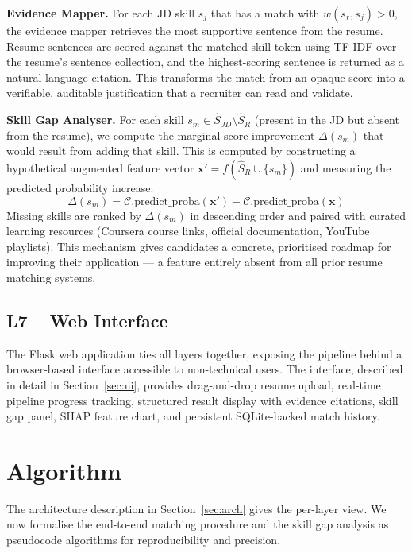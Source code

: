 \documentclass[conference]{IEEEtran}
\begin{document}
\textbf{Evidence Mapper.} For each JD skill $s_j$ that has a match with
$w(s_r, s_j) > 0$, the evidence mapper retrieves the most supportive
sentence from the resume. Resume sentences are scored against the matched
skill token using TF-IDF over the resume's sentence collection, and the
highest-scoring sentence is returned as a natural-language citation.
This transforms the match from an opaque score into a verifiable,
auditable justification that a recruiter can read and validate.

\textbf{Skill Gap Analyser.} For each skill $s_m \in \hat{S}_{JD}
\setminus \hat{S}_R$ (present in the JD but absent from the resume),
we compute the marginal score improvement $\Delta(s_m)$ that would result
from adding that skill. This is computed by constructing a hypothetical
augmented feature vector $\mathbf{x}' = f(\hat{S}_R \cup \{s_m\})$
and measuring the predicted probability increase:
\begin{equation}
  \Delta(s_m) = \mathcal{C}.\text{predict\_proba}(\mathbf{x}') -
               \mathcal{C}.\text{predict\_proba}(\mathbf{x})
  \label{eq:gap}
\end{equation}
Missing skills are ranked by $\Delta(s_m)$ in descending order and paired
with curated learning resources (Coursera course links, official documentation,
YouTube playlists). This mechanism gives candidates a concrete, prioritised
roadmap for improving their application --- a feature entirely absent from
all prior resume matching systems.

\subsection{L7 -- Web Interface}
The Flask web application ties all layers together, exposing the pipeline
behind a browser-based interface accessible to non-technical users. The
interface, described in detail in Section~\ref{sec:ui}, provides drag-and-drop
resume upload, real-time pipeline progress tracking, structured result display
with evidence citations, skill gap panel, SHAP feature chart, and persistent
SQLite-backed match history.

\section{Algorithm}
\label{sec:algo}

The architecture description in Section~\ref{sec:arch} gives the per-layer
view. We now formalise the end-to-end matching procedure and the skill gap
analysis as pseudocode algorithms for reproducibility and precision.
\end{document}
